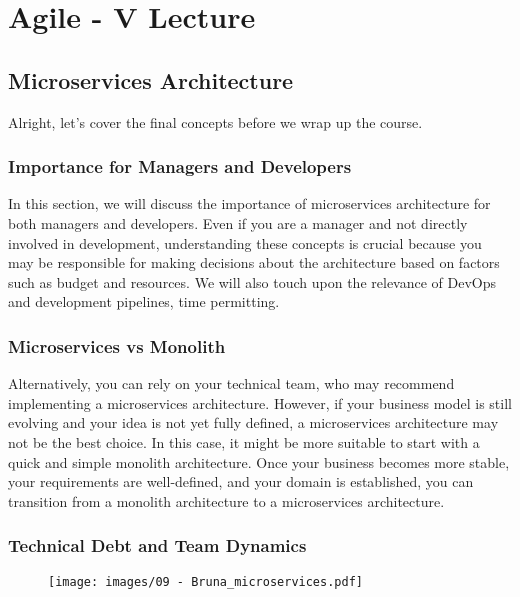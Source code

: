 \section{Agile - V Lecture}

\subsection{Microservices Architecture}

Alright, let's cover the final concepts before we wrap up the course.

\subsubsection{Importance for Managers and Developers}

In this section, we will discuss the importance of microservices
architecture for both managers and developers. Even if you are a manager
and not directly involved in development, understanding these concepts
is crucial because you may be responsible for making decisions about the
architecture based on factors such as budget and resources. We will also
touch upon the relevance of DevOps and development pipelines, time
permitting.

\subsubsection{Microservices vs Monolith}

Alternatively, you can rely on your technical team, who may recommend
implementing a microservices architecture. However, if your business
model is still evolving and your idea is not yet fully defined, a
microservices architecture may not be the best choice. In this case, it
might be more suitable to start with a quick and simple monolith
architecture. Once your business becomes more stable, your requirements
are well-defined, and your domain is established, you can transition
from a monolith architecture to a microservices architecture.

\subsubsection{Technical Debt and Team Dynamics}

\begin{figure}[!h]
  \centering
  \texttt{[image: images/09 - Bruna\_microservices.pdf]}
\end{figure}

